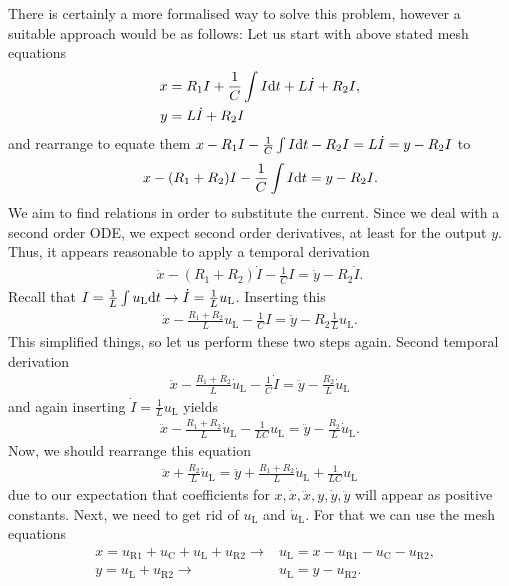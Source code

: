 \documentclass[11pt,a4paper,DIV=12]{scrartcl}
\newcommand\uc{u_\mathrm{C}}
\newcommand\ul{u_\mathrm{L}}
\newcommand\dul{\dot{u}_\mathrm{L}}
\newcommand\uri{u_\mathrm{R1}}
\newcommand\urii{u_\mathrm{R2}}
\newcommand\dx{\dot{x}}
\newcommand\ddx{\ddot{x}}
\newcommand\dy{\dot{y}}
\newcommand\ddy{\ddot{y}}
\renewcommand\c{I}
\newcommand\dc{\dot{I}}
\begin{document}
There is certainly a more formalised way to solve this problem, however a suitable
approach would be as follows:
%
Let us start with above stated mesh equations
%
\begin{align}
x& = R_1 \c + \frac{1}{C} \int \c \fsd t + L \dc + R_2 \c,\\
y& = L \dc + R_2 \c
\end{align}
%
and rearrange to equate them
$x - R_1 \c - \frac{1}{C} \int \c \fsd t - R_2 \c = L \dc = y - R_2 \c$
to
%
\begin{align}
x - (R_1+R_2) \c - \frac{1}{C} \int \c \fsd t = y - R_2 \c.
\end{align}
%
We aim to find relations in order to substitute the current. Since we deal with a
second order ODE, we expect second order derivatives, at least for the output $y$.
%
Thus, it appears reasonable to apply a temporal derivation
%
\begin{align}
\dx - (R_1+R_2) \dc - \frac{1}{C} \c  = \dy - R_2 \dc.
\end{align}
%
Recall that $\c = \frac{1}{L} \int \ul \fsd t \rightarrow \dc = \frac{1}{L} \ul$.
%
Inserting this
%
\begin{align}
\dx - \frac{R_1+R_2}{L} \ul - \frac{1}{C} \c  = \dy - R_2 \frac{1}{L} \ul.
\end{align}
%
This simplified things, so let us perform these two steps again.
%
Second temporal derivation
%
\begin{align}
\ddx - \frac{R_1+R_2}{L} \dul - \frac{1}{C} \dc  = \ddy - \frac{R_2}{L} \dul
\end{align}
%
and again inserting $\dc = \frac{1}{L} \ul$ yields
%
\begin{align}
\ddx - \frac{R_1+R_2}{L} \dul - \frac{1}{L C} \ul  = \ddy - \frac{R_2}{L} \dul.
\end{align}
%
Now, we should rearrange this equation
%
\begin{align}
\label{eq:ODE_with_uL}
\ddx + \frac{R_2}{L} \dul = \ddy + \frac{R_1+R_2}{L} \dul + \frac{1}{L C} \ul
\end{align}
%
due to our expectation that coefficients for $x, \dx, \ddx, y, \dy, \ddy$
will appear as positive constants.
%
Next, we need to get rid of $\ul$ and $\dul$. For that we can use the mesh
equations
%
\begin{align}
\label{eq:ODE_helper_x}
&x = \uri + \uc + \ul + \urii \rightarrow& \ul = x - \uri - \uc - \urii,\\
\label{eq:ODE_helper_y}
&y = \ul + \urii \rightarrow& \ul = y - \urii.
\end{align}
\end{document}
